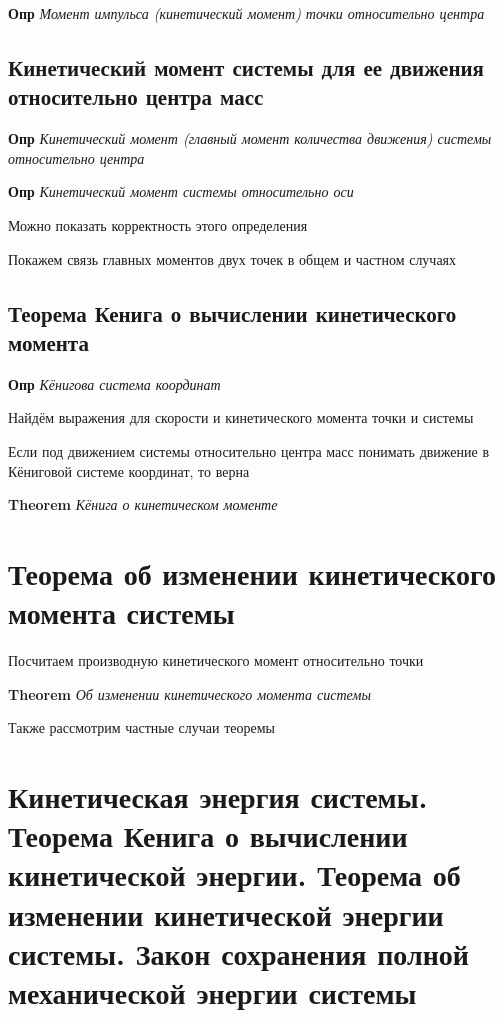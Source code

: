 \documentclass[a4paper, 14pt]{article}
\begin{document}
    \textbf{Опр} \textit{Момент импульса (кинетический момент) точки относительно центра}
    
    \subsection{Кинетический момент системы для ее движения относительно центра масс}
    
    \textbf{Опр} \textit{Кинетический момент (главный момент количества движения) системы относительно центра}
    
    \textbf{Опр} \textit{Кинетический момент системы относительно оси}
    
    Можно показать корректность этого определения
    
    Покажем связь главных моментов двух точек в общем и частном случаях
    
    \subsection{Теорема Кенига о вычислении кинетического момента}
    
    \textbf{Опр} \textit{Кёнигова система координат}
    
    Найдём выражения для скорости и кинетического момента точки и системы
    
    Если под движением системы относительно центра масс понимать движение в Кёниговой системе координат, то верна
    
    \textbf{Theorem} \textit{Кёнига о кинетическом моменте}
    
    \section{Теорема об изменении кинетического момента системы}
    
    Посчитаем производную кинетического момент относительно точки
    
    \textbf{Theorem} \textit{Об изменении кинетического момента системы}
    
    Также рассмотрим частные случаи теоремы
    
    \section{Кинетическая энергия системы.
    Теорема Кенига о вычислении кинетической энергии.
    Теорема об изменении кинетической энергии системы.
    Закон сохранения полной механической энергии системы}
    
\end{document}
